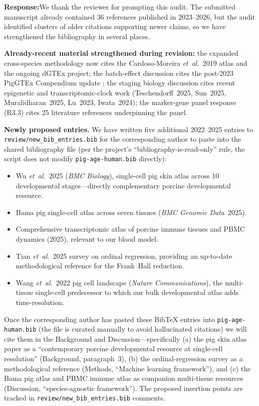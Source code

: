 \documentclass[11pt,a4paper]{article}
\newcommand{\response}[1]{%
  \par\vspace{2pt}\noindent\textbf{\textcolor{respcolor}{Response:}}\;\;#1\par\vspace{6pt}}
\begin{document}
\response{We thank the reviewer for prompting this audit. The submitted
manuscript already contained 36 references published in 2023--2026, but
the audit identified clusters of older citations supporting newer
claims, so we have strengthened the bibliography in several places.

\textbf{Already-recent material strengthened during revision:} the
expanded cross-species methodology now cites the Cardoso-Moreira
\textit{et~al.}~2019 atlas\cite{cardoso-moreira_gene_2019} and the
ongoing dGTEx project\cite{coorens_human_2025}; the batch-effect
discussion cites the post-2023 PigGTEx Compendium update
\cite{teng_compendium_2024, chen_construction_2025,
long_comprehensive_2024}; the staging biology discussion cites
recent epigenetic and transcriptomic-clock work
(Teschendorff~2025\cite{teschendorff_epigenetic_2025},
Sun~2025\cite{sun_spatial_2025},
Muralidharan~2025\cite{muralidharan_human_2025},
Lu~2023\cite{lu_universal_2023},
Iwata~2024\cite{iwata_metabolic_2024}); the marker-gene
panel response (R3.3) cites 25 literature references underpinning the
panel.

\textbf{Newly proposed entries.} We have written five additional 2022--2025
entries to
\texttt{review/new\_bib\_entries.bib} for the corresponding author to
paste into the shared bibliography file (per the project's
``bibliography-is-read-only'' rule, the script does not modify
\texttt{pig-age-human.bib} directly):
\begin{itemize}[leftmargin=*, itemsep=2pt, topsep=2pt]
  \item Wu \textit{et~al.}~2025 (\textit{BMC Biology}), single-cell pig
        skin atlas across 10 developmental stages---directly
        complementary porcine developmental resource.
  \item Bama pig single-cell atlas across seven tissues (\textit{BMC
        Genomic Data}~2025).
  \item Comprehensive transcriptomic atlas of porcine immune tissues
        and PBMC dynamics (2025), relevant to our blood model.
  \item Tian \textit{et~al.}~2025 survey on ordinal regression,
        providing an up-to-date methodological reference for the
        Frank--Hall reduction.
  \item Wang \textit{et~al.}~2022 pig cell landscape
        (\textit{Nature Communications}), the multi-tissue
        single-cell predecessor to which our bulk developmental atlas
        adds time-resolution.
\end{itemize}
Once the corresponding author has pasted these BibTeX entries into
\texttt{pig-age-human.bib} (the file is curated manually to avoid
hallucinated citations) we will cite them in the Background and
Discussion---specifically (a) the pig skin atlas paper as a
``contemporary porcine developmental resource at single-cell
resolution'' (Background, paragraph~3), (b) the ordinal-regression
survey as a methodological reference (Methods, ``Machine learning
framework''), and (c) the Bama pig atlas and PBMC immune atlas as
companion multi-tissue resources (Discussion, ``species-agnostic
framework''). The proposed insertion points are tracked in
\texttt{review/new\_bib\_entries.bib} comments.}
\end{document}
